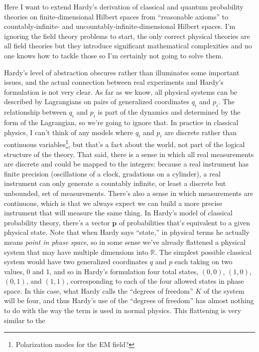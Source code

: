 \documentclass[12pt]{article}
\newcommand{\R}{{\mathbb R}} %
\begin{document}
Here I want to extend Hardy's derivation of classical and quantum
probability theories on finite-dimensional Hilbert spaces from
``reasonable axioms'' to countably-infinite- and
uncountably-infinite-dimensional Hilbert spaces.  I'm ignoring the
field theory problems to start, the only correct physical theories are
all field theories but they introduce significant mathematical
complexities and no one knows how to tackle those so I'm certainly not
going to solve them.

Hardy's level of abstraction obscures rather than illuminates some
important issues, and the actual connection between real experiments
and Hardy's formulation is not very clear.  As far as we know, all
physical systems can be described by Lagrangians on pairs of
generalized coordinates $q_i$ and $p_i$.  The relationship between
$q_i$ and $p_i$ is part of the dynamics and determined by the form of
the Lagrangian, so we're going to ignore that.  In practice in
classical physics, I can't think of any models where $q_i$ and $p_i$
are discrete rather than continuous variables\footnote{Polarization
  modes for the EM field?}, but that's a fact about the world, not
part of the logical structure of the theory.  That said, there is a
sense in which all real measurements are discrete and could be mapped
to the integers: because a real instrument has finite precision
(oscillations of a clock, gradations on a cylinder), a real instrument
can only generate a countably infinite, or least a discrete but
unbounded, set of measurements.  There's also a sense in which
measurements are continuous, which is that we always expect we can
build a more precise instrument that will measure the same thing.  In
Hardy's model of classical probability theory, there's a vector
$\mathbf{p}$ of probabilities that's equivalent to a given physical
state.  Note that when Hardy says ``state,'' in physical terms he
actually means \emph{point in phase space}, so in some sense we've
already flattened a physical system that may have multiple dimensions
into $\R$.  The simplest possible classical system would have two
generalized coordinates $q$ and $p$ each taking on two values, 0 and
1, and so in Hardy's formulation four total states, $(0,0)$, $(1,0)$,
$(0,1)$, and $(1,1)$, corresponding to each of the four allowed states
in phase space.  In this case, what Hardy calls the ``degrees of
freedom'' $K$ of the system will be four, and thus Hardy's use of the
``degrees of freedom'' has almost nothing to do with the way the term
is used in normal physics.  This flattening is very similar to the
\end{document}
